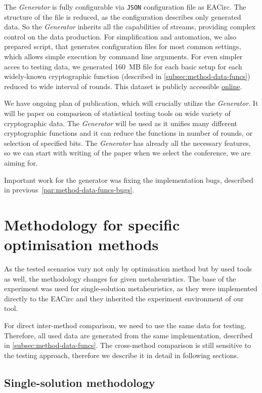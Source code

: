 \documentclass[
  print, %
  Table,   %
  nolof,     %
  nolot,     %
  11pt, %
  oneside  %
]{fithesis3}
\begin{document}
The \textit{Generator} is fully configurable via \texttt{JSON} configuration file as EACirc. The structure of the file is reduced, as the configuration describes only generated data. So the \textit{Generator} inherits all the capabilities of streams, providing complex control on the data production. For simplification and automation, we also prepared script, that generates configuration files for most common settings, which allows simple execution by command line arguments. For even simpler acces to testing data, we generated 160~MB file for each basic setup for each widely-known cryptographic function (described in \cref{subsec:method-data-funcs}) reduced to wide interval of rounds. This dataset is publicly accessible \href{https://drive.google.com/drive/folders/0B5Z1zst5NzwXQmFKaXgxREJWNk0?usp=sharing}{online}.

We have ongoing plan of publication, which will crucially utilize the \textit{Generator}. It will be paper on comparison of statistical testing tools on wide variety of cryptographic data. The \textit{Generator} will be used as it unifies many different cryptographic functions and it can reduce the functions in number of rounds, or selection of specified bits. The \textit{Generator} has already all the necessary features, so we can start with writing of the paper when we select the conference, we are aiming for.

Important work for the generator was fixing the implementation bugs, described in previous~\cref{par:method-data-funcs-bugs}.


\section{Methodology for specific optimisation methods}
\label{sec:method-spec}

As the tested scenarios vary not only by optimisation method but by used tools as well, the methodology changes for given metaheuristics. The base of the experiment was used for single-solution metaheuristics, as they were implemented directly to the EACirc and they inherited the experiment environment of our tool.

For direct inter-method comparison, we need to use the same data for testing. Therefore, all used data are generated from the same implementation, described in \cref{subsec:method-data-funcs}. The cross-method comparison is still sensitive to the testing approach, therefore we describe it in detail in following sections.


\subsection{Single-solution methodology}
\label{subsec:method-spec-ss}
\end{document}
